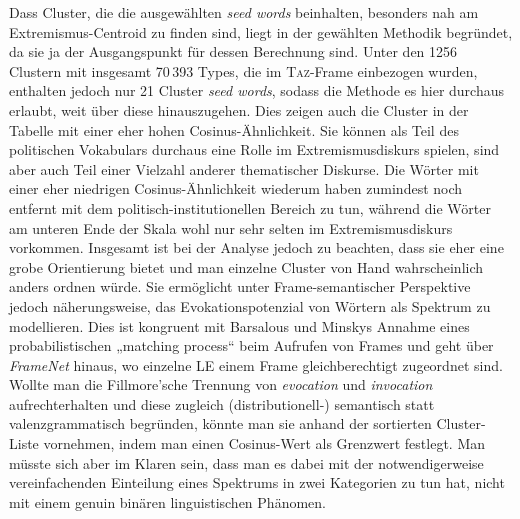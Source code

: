 Dass Cluster, die die ausgewählten \emph{seed words} beinhalten, besonders nah am Extremismus-Centroid zu finden sind, liegt in der gewählten Methodik begründet, da sie ja der Ausgangspunkt für dessen Berechnung sind. Unter den 1256 Clustern mit insgesamt 70\,393 Types, die im \textsc{Taz}-Frame einbezogen wurden, enthalten jedoch nur 21 Cluster \emph{seed words}, sodass die Methode es hier durchaus erlaubt, weit über diese hinauszugehen. Dies zeigen auch die Cluster in der Tabelle mit einer eher hohen Cosinus-Ähnlichkeit. Sie können als Teil des politischen Vokabulars durchaus eine Rolle im Extremismusdiskurs spielen, sind aber auch Teil einer Vielzahl anderer thematischer Diskurse. Die Wörter mit einer eher niedrigen Cosinus-Ähnlichkeit wiederum haben zumindest noch entfernt mit dem politisch-institutionellen Bereich zu tun, während die Wörter am unteren Ende der Skala wohl nur sehr selten im Extremismusdiskurs vorkommen. Insgesamt ist bei der Analyse jedoch zu beachten, dass sie eher eine grobe Orientierung bietet und man einzelne Cluster von Hand wahrscheinlich anders ordnen würde. Sie ermöglicht unter Frame-semantischer Perspektive jedoch näherungsweise, das Evokationspotenzial von Wörtern als Spektrum zu modellieren. Dies ist kongruent mit Barsalous und Minskys Annahme eines probabilistischen „matching process`` \autocite*[2]{minskyFrameworkRepresentingKnowledge1974} beim Aufrufen von Frames und geht über \emph{FrameNet} hinaus, wo einzelne LE einem Frame gleichberechtigt zugeordnet sind. Wollte man die Fillmore'sche Trennung von \emph{evocation} und \emph{invocation} aufrechterhalten \autocite[dazu kritisch][]{busseFrameSemantikKompendium2012} und diese zugleich (distributionell\mbox{-}) semantisch statt valenzgrammatisch begründen, könnte man sie anhand der sortierten Cluster-Liste vornehmen, indem man einen Cosinus-Wert als Grenzwert festlegt. Man müsste sich aber im Klaren sein, dass man es dabei mit der notwendigerweise vereinfachenden Einteilung eines Spektrums in zwei Kategorien zu tun hat, nicht mit einem genuin binären linguistischen Phänomen.

